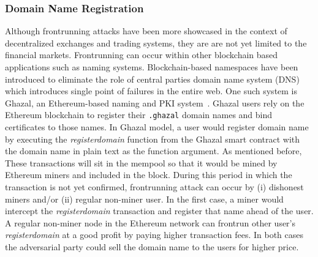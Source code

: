 \subsubsection{Domain Name Registration} 



%
Although frontrunning attacks have been more showcased in the context of decentralized exchanges and trading systems, they are are not yet limited to the financial markets. Frontrunning can occur within other blockchain based applications such as naming systems. Blockchain-based namespaces have been introduced to eliminate the role of central parties \ie domain name system (DNS) which introduces single point of failures in the entire web. One such system is Ghazal, an Ethereum-based naming and PKI system~\cite{moosavighazal}. Ghazal users rely on the Ethereum blockchain to register their \texttt{.ghazal} domain names and bind certificates to those names. In Ghazal model, a user would register domain name by executing the \textit{registerdomain} function from the Ghazal smart contract with the domain name in plain text as the function argument. As mentioned before, These transactions will sit in the mempool so that it would be mined by Ethereum miners and included in the block. During this period in which the transaction is not yet confirmed, frontrunning attack can occur by (i) dishonest miners and/or (ii) regular non-miner user. In the first case, a miner would intercept the \textit{registerdomain} transaction and register that name ahead of the user. A regular non-miner node in the Ethereum network can frontrun other user's \textit{registerdomain} at a good profit by paying higher transaction fees. In both cases the adversarial party could sell the domain name to the users for higher price.







